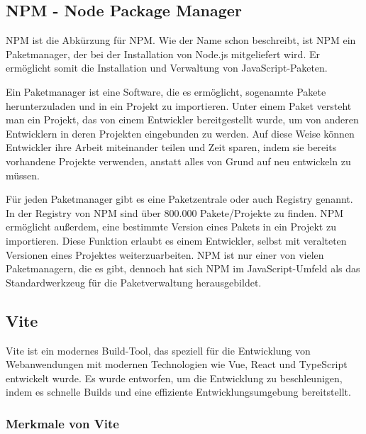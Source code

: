 \subsection{NPM - Node Package Manager}
\label{chapter:3-werkzeuge-npm}

\acs{NPM} ist die Abkürzung für \acf{NPM}. Wie der Name schon beschreibt, ist NPM ein Paketmanager, der bei der Installation von Node.js mitgeliefert wird. Er ermöglicht somit die Installation und Verwaltung von JavaScript-Paketen.

Ein Paketmanager ist eine Software, die es ermöglicht, sogenannte Pakete herunterzuladen und in ein Projekt zu importieren. Unter einem Paket versteht man ein Projekt, das von einem Entwickler bereitgestellt wurde, um von anderen Entwicklern in deren Projekten eingebunden zu werden. Auf diese Weise können Entwickler ihre Arbeit miteinander teilen und Zeit sparen, indem sie bereits vorhandene Projekte verwenden, anstatt alles von Grund auf neu entwickeln zu müssen.

Für jeden Paketmanager gibt es eine Paketzentrale oder auch Registry genannt. In der Registry von \acs{NPM} sind über 800.000 Pakete/Projekte zu finden. \acs{NPM} ermöglicht außerdem, eine bestimmte Version eines Pakets in ein Projekt zu importieren. Diese Funktion erlaubt es einem Entwickler, selbst mit veralteten Versionen eines Projektes weiterzuarbeiten. \acs{NPM} ist nur einer von vielen Paketmanagern, die es gibt, dennoch hat sich \acs{NPM} im JavaScript-Umfeld als das Standardwerkzeug für die Paketverwaltung herausgebildet.\cite{npm}

\subsection{Vite}

Vite ist ein modernes Build-Tool, das speziell für die Entwicklung von Webanwendungen mit modernen Technologien wie Vue, React und TypeScript entwickelt wurde. Es wurde entworfen, um die Entwicklung zu beschleunigen, indem es schnelle Builds und eine effiziente Entwicklungsumgebung bereitstellt. \cite{vitejs}

\subsubsection{Merkmale von Vite}

